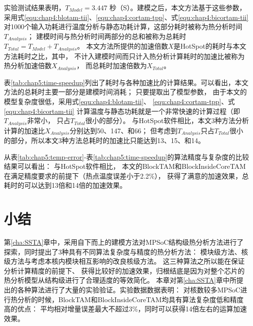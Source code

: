 实验测试结果表明，$T_{Model} = 3.447$ 秒（S）。建模之后，本文方法基于这些参数，采用式\ref{equ:chap4:blotam-tii}、\ref{equ:chap4:cortam-tpp}、式\ref{equ:chap4:bicortam-tii} 对1000个输入功耗进行温度分析与静态功耗计算，这部分耗时被称为热分析时间$T_{Analysis}$； 建模时间与热分析时间两部分的总和被称为总耗时$T_{Total}=T_{Model}+T_{Analysis}$。 本文方法所提供的加速倍数$X$是HotSpot的耗时与本文方法耗时之比，其中， 不计入建模时间而只计入热分析计算耗时的加速比被称为热分析加速倍数$X_{Analysis}$， 而总耗时加速倍数为$X_{Total}$。

表\ref{tab:chap5:time-speedup}列出了耗时与各种加速比的计算结果。可以看出，本文方法的总耗时主要一部分是建模时间消耗； 只要提取出了模型参数， 由于本文的模型复杂度很低，采用式\ref{equ:chap4:blotam-tii}、 \ref{equ:chap4:cortam-tpp}、式\ref{equ:chap4:bicortam-tii} 计算温度与静态功耗就是一个非常快速的计算过程（即$T_{Analysis}$非常小， 只占$T_{Total}$很小的部分）。 与HotSpot软件相比，本文3种方法分析计算的加速比$X_{Analysis}$分别达到50、147、和66； 但考虑到$T_{Analysis}$只占$T_{Total}$很小的部分，所以本文3种方法总耗时的加速比只能达到13、15、和14。

从表\ref{tab:chap5:temp-error}-表\ref{tab:chap5:time-speedup}的算法精度与复杂度的比较结果可以看出： 与HotSpot软件相比， 本文的BlockTAM和BlockInsideCoreTAM在满足精度要求的前提下（热点温度误差小于2.2\%）， 获得了满意的加速效果，总耗时的可以达到13倍和14倍的加速效果。

\section{小结}
第\ref{cha:SSTA}章中，采用自下而上的建模方法对MPSoC结构级热分析方法进行了探索，同时提出了3种具有不同算法复杂度与精度的热分析方法： 模块级方法、核级方法与考虑本核内模块相互影响的改良核级方法。 这三种算法之所以能在保证分析计算精度的前提下、 获得比较好的加速效果，归根结底是因为对整个芯片的热分析模型从结构级进行了合理适度的等效简化。
本章对第\ref{cha:SSTA}章中所提出的各种算法进行了大量的实验验证。实验数据数据表明： 对核数较多MPSoC进行热分析的时候，BlockTAM和BlockInsideCoreTAM均具有算法复杂度低和精度高的优点： 平均相对增量误差最大不超过3\%，同时可以获得14倍左右的运算加速效果。 